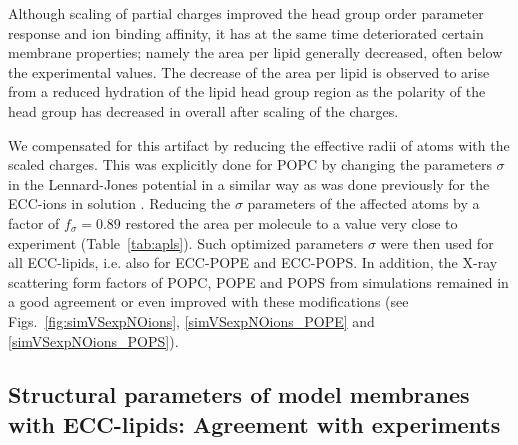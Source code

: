 Although scaling of partial charges improved 
the head group order parameter response and ion binding affinity,
it has at the same time deteriorated certain membrane properties; 
namely the area per lipid generally decreased, often below the experimental values. 
The decrease of the area per lipid is observed to arise from a reduced hydration of the lipid head group region
as the polarity of the head group has decreased in overall after scaling of the charges. 

We compensated for this artifact
by reducing the effective radii of atoms with the scaled charges.
This was explicitly done for POPC by changing the parameters $\sigma$ in the Lennard-Jones potential 
in a similar way as was done previously for the ECC-ions in solution \citep{kohagen14,kohagen16,Pluharova2014}.
Reducing the $\sigma$ parameters of the affected atoms by a factor of $f_\sigma = 0.89$
restored the area per molecule to a value very close to experiment (Table~\ref{tab:apls}). 
Such optimized parameters $\sigma$ were then used for all ECC-lipids, i.e. also for ECC-POPE and ECC-POPS. 
In addition, the X-ray scattering form factors of POPC, POPE and POPS from simulations remained in a good agreement or even improved with these modifications 
(see Figs.~\ref{fig:simVSexpNOions}, \ref{simVSexpNOions_POPE} and \ref{simVSexpNOions_POPS}). 








\subsection{Structural parameters of model membranes with ECC-lipids: Agreement with experiments} 
 
